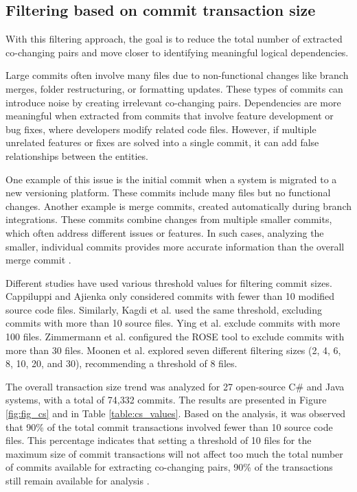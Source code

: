 \subsection{Filtering based on commit transaction size}
\label{subsec:filtering_transaction_size}

\hspace{4em}With this filtering approach, the goal is to reduce the total number of extracted co-changing pairs and move closer to identifying meaningful logical dependencies. 

Large commits often involve many files due to non-functional changes like branch merges, folder restructuring, or formatting updates. These types of commits can introduce noise by creating irrelevant co-changing pairs. Dependencies are more meaningful when extracted from commits that involve feature development or bug fixes, where developers modify related code files. However, if multiple unrelated features or fixes are solved into a single commit, it can add false relationships between the entities.

One example of this issue is the initial commit when a system is migrated to a new versioning platform. These commits include many files but no functional changes. Another example is merge commits, created automatically during branch integrations. These commits combine changes from multiple smaller commits, which often address different issues or features. In such cases, analyzing the smaller, individual commits provides more accurate information than the overall merge commit \cite{cluster-access}.

Different studies have used various threshold values for filtering commit sizes. Cappiluppi and Ajienka \cite{DBLP:journals/jss/AjienkaC17, DBLP:journals/ese/AjienkaCC18} only considered commits with fewer than 10 modified source code files. Similarly, Kagdi et al. used the same threshold, excluding commits with more than 10 source files. Ying et al. \cite{Ying-co-change} exclude commits with more 100 files. Zimmermann et al. \cite{Zimmermann:2004:MVH:998675.999460} configured the ROSE tool to exclude commits with more than 30 files. Moonen et al. \cite{Moonen-commit} explored seven different filtering sizes (2, 4, 6, 8, 10, 20, and 30), recommending a threshold of 8 files.



The overall transaction size trend was analyzed for 27 open-source C\# and Java systems, with a total of 74,332 commits. The results are presented in Figure \ref{fig:fig_cs} and in Table \ref{table:cs_values}. Based on the analysis, it was observed that 90\% of the total commit transactions involved fewer than 10 source code files. This percentage indicates that setting a threshold of 10 files for the maximum size of commit transactions will not affect too much the total number of commits available for extracting co-changing pairs, 90\% of the transactions still remain available for analysis \cite{DepSACI, enase19}.

